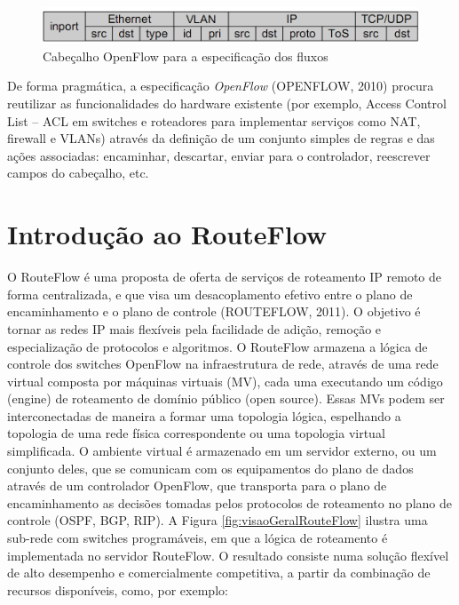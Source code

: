 \begin{figure}[hb]
\centering
\includegraphics[width=160mm]{cabecalhoOpenflow.png}
\caption{Cabeçalho OpenFlow para a especificação dos fluxos}
\label{fig:cabecalhoOpenflow}
\end{figure}

De forma pragmática, a especificação \textit{OpenFlow} (OPENFLOW, 2010) procura reutilizar as
funcionalidades do hardware existente (por exemplo, Access Control List – ACL em switches
e roteadores para implementar serviços como NAT, firewall e VLANs) através da definição de
um conjunto simples de regras e das ações associadas: encaminhar, descartar, enviar para o
controlador, reescrever campos do cabeçalho, etc. 

\section{Introdução ao RouteFlow}

O RouteFlow é uma proposta de oferta de serviços de roteamento IP remoto de forma
centralizada, e que visa um desacoplamento efetivo entre o plano de encaminhamento e o
plano de controle (ROUTEFLOW, 2011). O objetivo é tornar as redes IP mais flexíveis pela
facilidade de adição, remoção e especialização de protocolos e algoritmos. O RouteFlow
armazena a lógica de controle dos switches OpenFlow na infraestrutura de rede, através de
uma rede virtual composta por máquinas virtuais (MV), cada uma executando um código (engine)
de roteamento de domínio público (open source). Essas MVs podem ser interconectadas de
maneira a formar uma topologia lógica, espelhando a topologia de uma rede física
correspondente ou uma topologia virtual simplificada. O ambiente virtual é armazenado
em um servidor externo, ou um conjunto deles, que se comunicam com os equipamentos do
plano de dados através de um controlador OpenFlow, que transporta para o plano de
encaminhamento as decisões tomadas pelos protocolos de roteamento no plano de controle
(OSPF, BGP, RIP). A Figura \ref{fig:visaoGeralRouteFlow} ilustra uma sub-rede com switches programáveis, em que a
lógica de roteamento é implementada no servidor RouteFlow. 
O resultado consiste numa solução flexível de alto desempenho e comercialmente competitiva,
a partir da combinação de recursos disponíveis, como, por exemplo:


